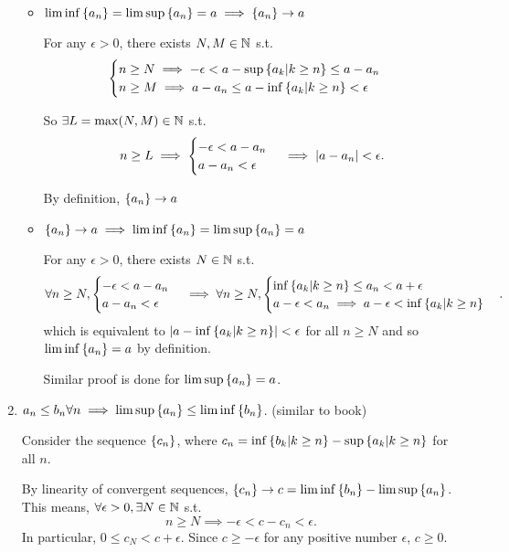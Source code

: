 \begin{enumerate}[label=(\roman*)]
    \begin{itemize}
        \item $\liminf\left\{a_n\right\} = \limsup\left\{a_n\right\} = a \implies \left\{a_n\right\}\to a$
        
        For any $\epsilon > 0$, there exists $N, M\in\mathbb{N}$ s.t.
        \[\begin{cases}
            n\geq N \implies -\epsilon < a - \sup\left\{a_k | k \geq n\right\} \leq a - a_n \\
            n\geq M \implies a - a_n \leq a - \inf\left\{a_k | k \geq n\right\} < \epsilon
        \end{cases} \]

        So $\exists L = \max(N, M) \in \mathbb{N}$ s.t.
        \[ n \geq L \implies \begin{cases}
            -\epsilon < a - a_n \\ a - a_n < \epsilon
        \end{cases} \implies \left|a - a_n\right| < \epsilon. \] 

        By definition, $\left\{a_n\right\}\to a$

        \item $\left\{a_n\right\}\to a \implies \liminf\left\{a_n\right\} = \limsup\left\{a_n\right\} = a$
        
        For any $\epsilon > 0$, there exists $N \in\mathbb{N}$ s.t.
        \[\forall n \geq N, \begin{cases}
            -\epsilon < a - a_n \\
            a - a_n < \epsilon
        \end{cases}\implies \forall n \geq N,\begin{cases}
            \inf\left\{a_k | k \geq n\right\} \leq a_n < a + \epsilon \\
            a - \epsilon < a_n \implies a - \epsilon < \inf\left\{a_k | k \geq n\right\} 
        \end{cases}. \]
        which is equivalent to $\left|a - \inf\left\{a_k | k \geq n\right\}\right| < \epsilon$ for all $n\geq N$ and so $\liminf\left\{a_n\right\} = a$ by definition.

        Similar proof is done for $\limsup\left\{a_n\right\} = a$.
    \end{itemize}
     

    \item $a_n \leq b_n \forall n \implies \limsup\left\{a_n\right\} \leq \liminf\left\{b_n\right\}$. (similar to book)
    
    Consider the sequence $\left\{c_n\right\}$, where $c_n = \inf\left\{b_k | k \geq n\right\} - \sup\left\{a_k | k \geq n\right\}$ for all $n$. 
    
    By linearity of convergent sequences, $\left\{c_n\right\}\to c = \liminf\left\{b_n\right\} - \limsup\left\{a_n\right\}$.
    This means, $\forall \epsilon > 0, \exists N\in\mathbb{N}$ s.t.
    \[ n\geq N \implies -\epsilon < c - c_n < \epsilon. \]
    In particular, $0\leq c_N < c + \epsilon$. Since $c \geq -\epsilon$ for any positive number $\epsilon$, $c \geq 0$.
\end{enumerate}


